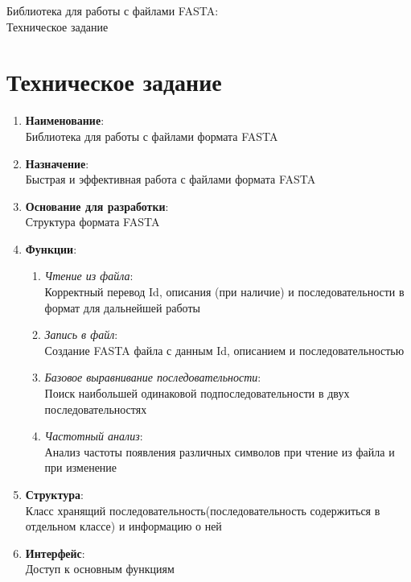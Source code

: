 \documentclass{article}
\begin{document}
    \begin{titlepage}
        \newpage
            \begin{center}
                \Large Библиотека для работы с файлами FASTA:\\
                Техническое задание
            \end{center}
    \end{titlepage}
    
    \part{Техническое задание}
        \begin{enumerate}
          \item \textbf{Наименование}: \\Библиотека для работы с файлами формата FASTA
          \item \textbf{Назначение}: \\Быстрая и эффективная работа с файлами формата FASTA
          \item \textbf{Основание для разработки}: \\Структура формата FASTA          
          \item \textbf{Функции}:
          \begin{enumerate}
              \item \emph{Чтение из файла}: \\Корректный перевод Id, описания (при наличие) и последовательности в формат для дальнейшей работы
              \item \emph{Запись в файл}: \\Создание FASTA файла с данным Id, описанием и последовательностью
              \item \emph{Базовое выравнивание последовательности}: \\Поиск наибольшей одинаковой подпоследовательности в двух последовательностях
              \item \emph{Частотный анализ}: \\Анализ частоты появления различных символов при чтение из файла и при изменение
          \end{enumerate}
          \item \textbf{Структура}: \\Класс хранящий последовательность(последовательность содержиться в отдельном классе) и информацию о ней
          \item \textbf{Интерфейс}: \\Доступ к основным функциям
        \end{enumerate}
\end{document}
